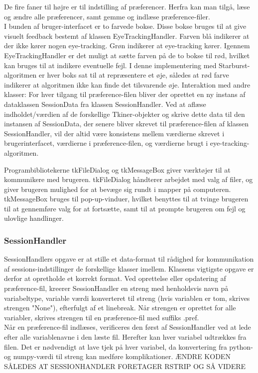 \documentclass[rapport.tex]{subfiles}
\begin{document}
	De fire faner til højre er til indstilling af præferencer. Herfra kan man tilgå, læse og ændre alle præferencer, samt gemme og indlæse præference-filer.\\
	
	I bunden af bruger-interfacet er to farvede bokse. Disse bokse bruges til at give visuelt feedback bestemt af klassen EyeTrackingHandler. Farven blå indikerer at der ikke kører nogen eye-tracking. Grøn indikerer at eye-tracking kører. Igennem EyeTrackingHandler er det muligt at sætte farven på de to bokse til rød, hvilket kan bruges til at indikere eventuelle fejl. I denne implementering med Starburst-algoritmen er hver boks sat til at repræsentere et øje, således at rød farve indikerer at algoritmen ikke kan finde det tilsvarende øje. 
	Interaktion med andre klasser:
	For hver tilgang til præference-filen bliver der oprettet en ny instans af dataklassen SessionData fra klassen SessionHandler. Ved at aflæse indholdet/værdien af de forskellige Tkiner-objekter og skrive dette data til den instansen af SessionData, der senere bliver skrevet til præference-filen af klassen SessionHandler, vil der altid være konsistens mellem værdierne skrevet i brugerinterfacet, værdierne i præference-filen, og værdierne brugt i eye-tracking-algoritmen. 
	
	Programbibliotekerne tkFileDialog og tkMessageBox giver værktøjer til at kommunikere med brugeren. tkFileDialog håndterer arbejdet med valg af filer, og giver brugeren mulighed for at bevæge sig rundt i mapper på computeren. tkMessageBox bruges til pop-up-vinduer, hvilket benyttes til at tvinge brugeren til at gennemføre valg for at fortsætte, samt til at prompte brugeren om fejl og ulovlige handlinger. 
	
	
	\subsubsection{SessionHandler}
	SessionHandlers opgave er at stille et data-format til rådighed for kommunikation af sessions-indstillinger de forskellige klasser imellem. Klassens vigtigste opgave er derfor at opretholde et korrekt format. Ved oprettelse eller opdatering af præference-fil, kreerer SessionHandler en streng med henholdsvis navn på variabeltype, variable værdi konverteret til streng (hvis variablen er tom, skrives strengen "None"), efterfulgt af et linebreak. Når strengen er oprettet for alle variabler, skrives strengen til en præference-fil med suffiks .pref. \\
	Når en præference-fil indlæses, verificeres den først af SessionHandler ved at lede efter alle variablenavne i den læste fil. Herefter kan hver variabel udtrækkes fra filen. Det er nødvendigt at lave tjek på hver variabel, da konvertering fra python- og numpy-værdi til streng kan medføre komplikationer. 
	ÆNDRE KODEN SÅLEDES AT SESSIONHANDLER FORETAGER RSTRIP OG SÅ VIDERE 
	
\end{document}
